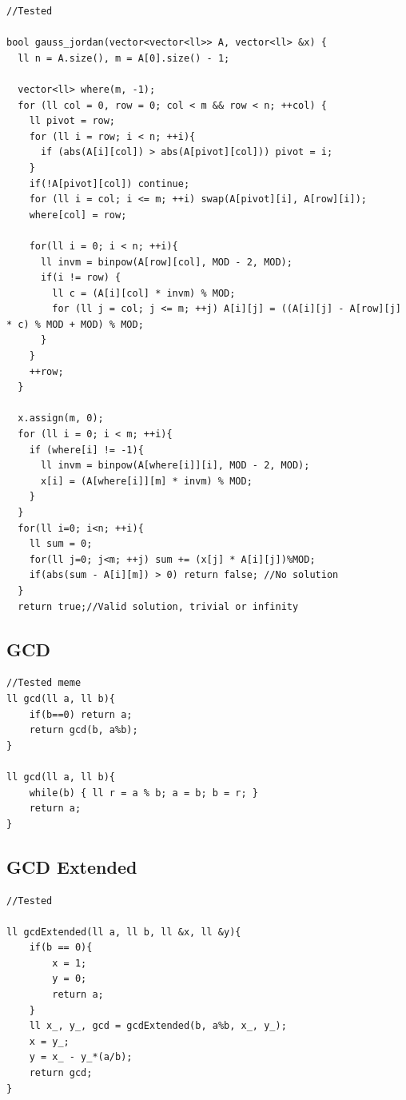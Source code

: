 \documentclass[10pt,a4paper,twocolumn]{article}
\begin{document}
	\begin{lstlisting}[style=cpp, title={gaussian-elimination.cpp}]
//Tested

bool gauss_jordan(vector<vector<ll>> A, vector<ll> &x) {
  ll n = A.size(), m = A[0].size() - 1;
 
  vector<ll> where(m, -1);
  for (ll col = 0, row = 0; col < m && row < n; ++col) {
    ll pivot = row;
    for (ll i = row; i < n; ++i){
      if (abs(A[i][col]) > abs(A[pivot][col])) pivot = i;
    }
    if(!A[pivot][col]) continue;
    for (ll i = col; i <= m; ++i) swap(A[pivot][i], A[row][i]);
    where[col] = row;
 
    for(ll i = 0; i < n; ++i){
      ll invm = binpow(A[row][col], MOD - 2, MOD);
      if(i != row) {
        ll c = (A[i][col] * invm) % MOD;
        for (ll j = col; j <= m; ++j) A[i][j] = ((A[i][j] - A[row][j] * c) % MOD + MOD) % MOD;
      }
    }
    ++row;
  }
 
  x.assign(m, 0);
  for (ll i = 0; i < m; ++i){
    if (where[i] != -1){
      ll invm = binpow(A[where[i]][i], MOD - 2, MOD);
      x[i] = (A[where[i]][m] * invm) % MOD;
    }
  }
  for(ll i=0; i<n; ++i){
    ll sum = 0;
    for(ll j=0; j<m; ++j) sum += (x[j] * A[i][j])%MOD;
    if(abs(sum - A[i][m]) > 0) return false; //No solution
  }
  return true;//Valid solution, trivial or infinity

	\end{lstlisting}

	\subsection{GCD}
	
	\begin{lstlisting}[style=cpp, title={gcd.cpp}]
//Tested meme
ll gcd(ll a, ll b){
    if(b==0) return a;
    return gcd(b, a%b);
}

ll gcd(ll a, ll b){
    while(b) { ll r = a % b; a = b; b = r; }
    return a;
}
	\end{lstlisting}
	\subsection{GCD Extended}
	
	\begin{lstlisting}[style=cpp, title={gcdExtended.cpp}]
//Tested

ll gcdExtended(ll a, ll b, ll &x, ll &y){
    if(b == 0){
        x = 1;
        y = 0;
        return a;
    }
    ll x_, y_, gcd = gcdExtended(b, a%b, x_, y_);
    x = y_;
    y = x_ - y_*(a/b);
    return gcd;
}
	\end{lstlisting}
\end{document}
